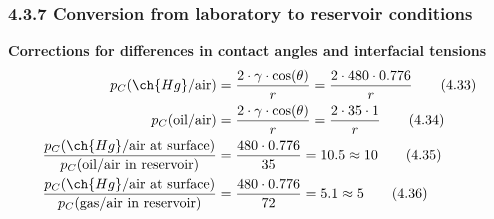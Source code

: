 \subsubsection{4.3.7 Conversion from laboratory to reservoir conditions}
\textbf{Corrections for differences in contact angles and interfacial tensions}
\begin{align}
    p_C(\ch{Hg} / \mathrm{air})                                                                                  & = \frac{2\cdot\gamma\cdot\cos(\theta)}{r} = \frac{2\cdot 480\cdot0.776}{r}\tag{4.33} \\
    p_C(\mathrm{oil} / \mathrm{air})                                                                             & = \frac{2\cdot\gamma\cdot\cos(\theta)}{r} = \frac{2\cdot 35\cdot1}{r}\tag{4.34}      \\
    \frac{p_C(\ch{Hg} / \mathrm{air}\ \text{at surface})}{p_C(\mathrm{oil} / \mathrm{air}\ \text{in reservoir})} & = \frac{480\cdot 0.776}{35} = 10.5\approx10\tag{4.35}                                \\
    \frac{p_C(\ch{Hg} / \mathrm{air}\ \text{at surface})}{p_C(\mathrm{gas} / \mathrm{air}\ \text{in reservoir})} & = \frac{480\cdot 0.776}{72} = 5.1\approx5\tag{4.36}
\end{align}

